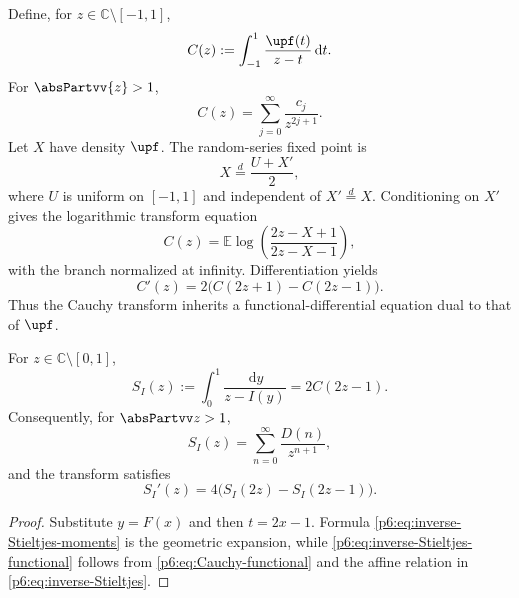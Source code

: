 \documentclass[11pt,oneside]{article}
\theoremstyle{definition}
\theoremstyle{remark}
\newcommand{\E}{\mathbb E}
\newcommand{\C}{\mathbb C}
\newcommand{\dd}{\,\mathrm d}
\newcommand{\1}{\mathbf 1}
\begin{document}
Define, for \(z\in\C\setminus[-1,1]\),
\begin{equation}
 C(z):=\int_{-1}^1\frac{\upf(t)}{z-t}\dd t.               \label{p6:eq:Cauchy-def}
\end{equation}
For \(\absPartvv{z}>1\),
\begin{equation}
 C(z)=\sum_{j=0}^{\infty}\frac{c_j}{z^{2j+1}}.            \label{p6:eq:Cauchy-moment}
\end{equation}
Let \(X\) have density \(\upf\).  The random-series fixed point is
\begin{equation}
 X\stackrel{d}{=}\frac{U+X'}2,                               \label{p6:eq:random-fixed-point}
\end{equation}
where \(U\) is uniform on \([-1,1]\) and independent of \(X'\stackrel{d}{=}X\).
Conditioning on \(X'\) gives the logarithmic transform equation
\begin{equation}
 \boxed{
 C(z)=\E\log\!\left(\frac{2z-X+1}{2z-X-1}\right),
 }                                                        \label{p6:eq:Cauchy-log}
\end{equation}
with the branch normalized at infinity.  Differentiation yields
\begin{equation}
 C'(z)=2\bigl(C(2z+1)-C(2z-1)\bigr).                     \label{p6:eq:Cauchy-functional}
\end{equation}
Thus the Cauchy transform inherits a functional-differential equation dual to that of
\(\upf\).

\begin{corollary}
\label{p6:cor:inverse-Stieltjes}
For \(z\in\C\setminus[0,1]\),
\begin{equation}
 \boxed{
 S_I(z):=\int_0^1\frac{\dd y}{z-I(y)}=2C(2z-1).
 }                                                          \label{p6:eq:inverse-Stieltjes}
\end{equation}
Consequently, for \(\absPartvv z>1\),
\begin{equation}
 S_I(z)=\sum_{n=0}^{\infty}\frac{D(n)}{z^{n+1}},           \label{p6:eq:inverse-Stieltjes-moments}
\end{equation}
and the transform satisfies
\begin{equation}
 S_I'(z)=4\bigl(S_I(2z)-S_I(2z-1)\bigr).                  \label{p6:eq:inverse-Stieltjes-functional}
\end{equation}
\end{corollary}

\begin{proof}
Substitute \(y=F(x)\) and then \(t=2x-1\).  Formula
\eqref{p6:eq:inverse-Stieltjes-moments} is the geometric expansion, while
\eqref{p6:eq:inverse-Stieltjes-functional} follows from
\eqref{p6:eq:Cauchy-functional} and the affine relation in
\eqref{p6:eq:inverse-Stieltjes}.
\end{proof}
\end{document}
